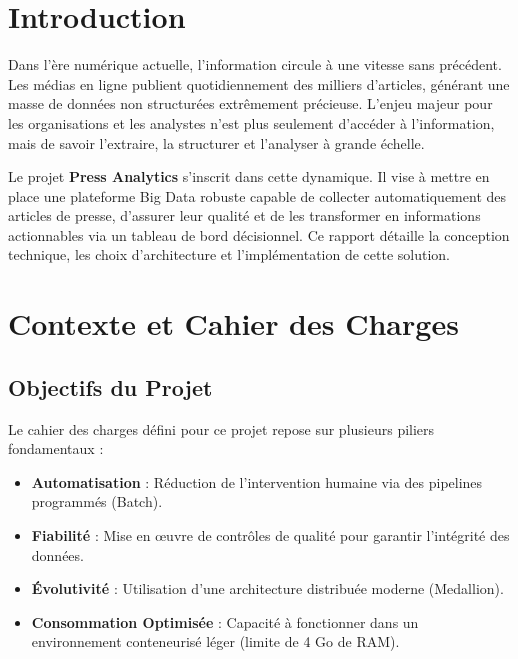 \documentclass[12pt,a4paper]{article}
\begin{document}
\newpage

\tableofcontents
\newpage

\section{Introduction}
Dans l'ère numérique actuelle, l'information circule à une vitesse sans précédent. Les médias en ligne publient quotidiennement des milliers d'articles, générant une masse de données non structurées extrêmement précieuse. L'enjeu majeur pour les organisations et les analystes n'est plus seulement d'accéder à l'information, mais de savoir l'extraire, la structurer et l'analyser à grande échelle.

Le projet \textbf{Press Analytics} s'inscrit dans cette dynamique. Il vise à mettre en place une plateforme Big Data robuste capable de collecter automatiquement des articles de presse, d'assurer leur qualité et de les transformer en informations actionnables via un tableau de bord décisionnel. Ce rapport détaille la conception technique, les choix d'architecture et l'implémentation de cette solution.

\section{Contexte et Cahier des Charges}
\subsection{Objectifs du Projet}
Le cahier des charges défini pour ce projet repose sur plusieurs piliers fondamentaux :
\begin{itemize}
    \item \textbf{Automatisation} : Réduction de l'intervention humaine via des pipelines programmés (Batch).
    \item \textbf{Fiabilité} : Mise en œuvre de contrôles de qualité pour garantir l'intégrité des données.
    \item \textbf{Évolutivité} : Utilisation d'une architecture distribuée moderne (Medallion).
    \item \textbf{Consommation Optimisée} : Capacité à fonctionner dans un environnement conteneurisé léger (limite de 4 Go de RAM).
\end{itemize}
\end{document}
